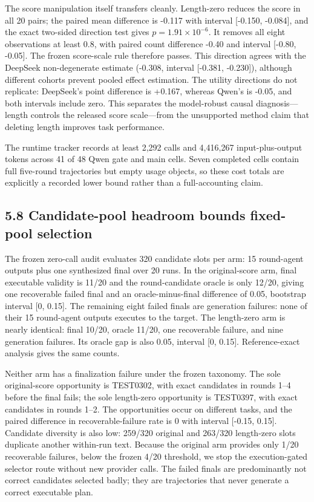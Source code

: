 \documentclass{article}
\begin{document}
The score manipulation itself transfers cleanly. Length-zero reduces the score in all 20 pairs; the paired mean difference is -0.117 with interval [-0.150, -0.084], and the exact two-sided direction test gives \(p=1.91\times10^{-6}\). It removes all eight observations at least 0.8, with paired count difference -0.40 and interval [-0.80, -0.05]. The frozen score-scale rule therefore passes. This direction agrees with the DeepSeek non-degenerate estimate (-0.308, interval [-0.381, -0.230]), although different cohorts prevent pooled effect estimation. The utility directions do not replicate: DeepSeek's point difference is +0.167, whereas Qwen's is -0.05, and both intervals include zero. This separates the model-robust causal diagnosis---length controls the released score scale---from the unsupported method claim that deleting length improves task performance.

The runtime tracker records at least 2,292 calls and 4,416,267 input-plus-output tokens across 41 of 48 Qwen gate and main cells. Seven completed cells contain full five-round trajectories but empty usage objects, so these cost totals are explicitly a recorded lower bound rather than a full-accounting claim.

\subsection{5.8 Candidate-pool headroom bounds fixed-pool selection}

The frozen zero-call audit evaluates 320 candidate slots per arm: 15 round-agent outputs plus one synthesized final over 20 runs. In the original-score arm, final executable validity is 11/20 and the round-candidate oracle is only 12/20, giving one recoverable failed final and an oracle-minus-final difference of 0.05, bootstrap interval [0, 0.15]. The remaining eight failed finals are generation failures: none of their 15 round-agent outputs executes to the target. The length-zero arm is nearly identical: final 10/20, oracle 11/20, one recoverable failure, and nine generation failures. Its oracle gap is also 0.05, interval [0, 0.15]. Reference-exact analysis gives the same counts.

Neither arm has a finalization failure under the frozen taxonomy. The sole original-score opportunity is TEST0302, with exact candidates in rounds 1--4 before the final fails; the sole length-zero opportunity is TEST0397, with exact candidates in rounds 1--2. The opportunities occur on different tasks, and the paired difference in recoverable-failure rate is 0 with interval [-0.15, 0.15]. Candidate diversity is also low: 259/320 original and 263/320 length-zero slots duplicate another within-run text. Because the original arm provides only 1/20 recoverable failures, below the frozen 4/20 threshold, we stop the execution-gated selector route without new provider calls. The failed finals are predominantly not correct candidates selected badly; they are trajectories that never generate a correct executable plan.
\end{document}
